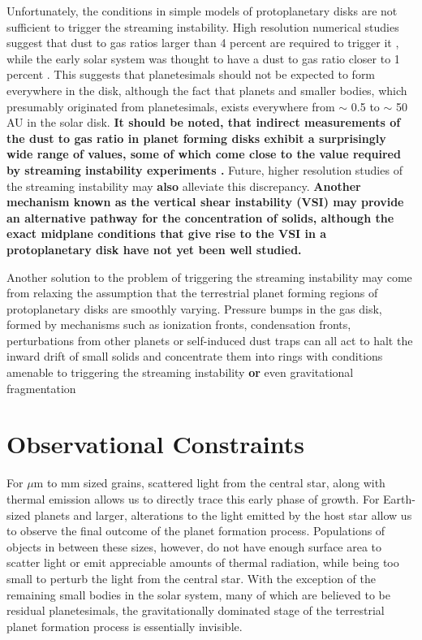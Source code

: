 Unfortunately, the conditions in simple models of protoplanetary disks are not sufficient to trigger the streaming instability. High resolution numerical studies suggest that dust to gas ratios larger than 4 percent are required to trigger it \cite{carrera15, yang17}, while the early solar system was thought to have a dust to gas ratio closer to 1 percent \cite{hayashi81}. This suggests that planetesimals should not be expected to form everywhere in the disk, although the fact that planets and smaller bodies, which presumably originated from planetesimals, exists everywhere from $\sim$ 0.5 to $\sim$ 50 AU in the solar disk. \textbf{It should be noted, that indirect measurements of the dust to gas ratio in planet forming disks exhibit a surprisingly wide range of values, some of which come close to the value required by streaming instability experiments \cite{rich21, jermyn22}.} Future, higher resolution studies of the streaming instability may \textbf{also} alleviate this discrepancy. \textbf{Another mechanism known as the vertical shear instability (VSI) \cite{urpin98} may provide an alternative pathway for the concentration of solids, although the exact midplane conditions that give rise to the VSI in a protoplanetary disk have not yet been well studied.}

Another solution to the problem of triggering the streaming instability may come from relaxing the assumption that the terrestrial planet forming regions of protoplanetary disks are smoothly varying. Pressure bumps in the gas disk, formed by mechanisms such as ionization fronts, condensation fronts, perturbations from other planets or self-induced dust traps \cite{gonzalez17} can all act to halt the inward drift of small solids and concentrate them into rings with conditions amenable to triggering the streaming instability \textbf{or} even gravitational fragmentation \textbf{\cite{chatterjee14, izidoro21, morbidelli21, batygin23a}}

\section{Observational Constraints}\label{sec:obsConstraints}

For $\mu$m to mm sized grains, scattered light from the central star, along with thermal emission allows us to directly trace this early phase of growth. For Earth-sized planets and larger, alterations to the light emitted by the host star allow us to observe the final outcome of the planet formation process. Populations of objects in between these sizes, however, do not have enough surface area to scatter light or emit appreciable amounts of thermal radiation, while being too small to perturb the light from the central star. With the exception of the remaining small bodies in the solar system, many of which are believed to be residual planetesimals, the gravitationally dominated stage of the terrestrial planet formation process is essentially invisible.

